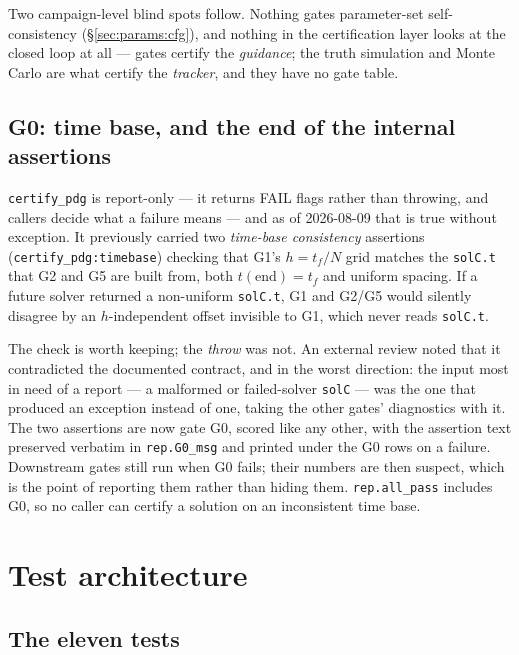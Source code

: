 \documentclass[11pt]{article}
\begin{document}
Two campaign-level blind spots follow. Nothing gates parameter-set
self-consistency (\S\ref{sec:params:cfg}), and nothing in the certification
layer looks at the closed loop at all --- gates certify the \emph{guidance};
the truth simulation and Monte Carlo are what certify the \emph{tracker},
and they have no gate table.

\subsection{G0: time base, and the end of the internal assertions}
\label{sec:certify:g0}

\texttt{certify\_pdg} is report-only --- it returns FAIL flags rather than
throwing, and callers decide what a failure means --- and as of 2026-08-09
that is true without exception. It previously carried two \emph{time-base
consistency} assertions (\texttt{certify\_pdg:timebase}) checking that G1's
$h = t_f/N$ grid matches the \texttt{solC.t} that G2 and G5 are built from,
both $t(\text{end}) = t_f$ and uniform spacing. If a future solver returned
a non-uniform \texttt{solC.t}, G1 and G2/G5 would silently disagree by an
$h$-independent offset invisible to G1, which never reads \texttt{solC.t}.

The check is worth keeping; the \emph{throw} was not. An external review
noted that it contradicted the documented contract, and in the worst
direction: the input most in need of a report --- a malformed or
failed-solver \texttt{solC} --- was the one that produced an exception
instead of one, taking the other gates' diagnostics with it. The two
assertions are now gate G0, scored like any other, with the assertion text
preserved verbatim in \texttt{rep.G0\_msg} and printed under the G0 rows on
a failure. Downstream gates still run when G0 fails; their numbers are then
suspect, which is the point of reporting them rather than hiding them.
\texttt{rep.all\_pass} includes G0, so no caller can certify a solution on
an inconsistent time base.

\section{Test architecture}
\label{sec:tests}

\subsection{The eleven tests}
\end{document}
